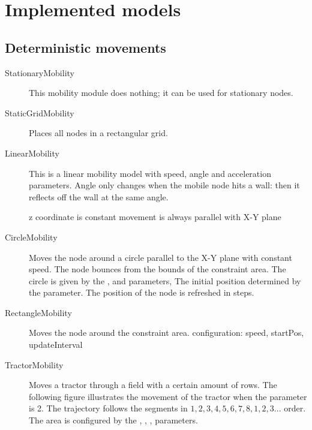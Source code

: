 \section{Implemented models}

\subsection{Deterministic movements}

\begin{description}

\item[StationaryMobility] This mobility module does nothing;
it can be used for stationary nodes.

\item[StaticGridMobility] Places all nodes in a rectangular grid.


\item[LinearMobility] This is a linear mobility model with speed,
angle and acceleration parameters. Angle only changes when the mobile
node hits a wall: then it reflects off the wall at the same angle.

z coordinate is constant
movement is always parallel with X-Y plane


\item[CircleMobility] Moves the node around a circle parallel to the X-Y plane
with constant speed.
The node bounces from the bounds of the constraint area.
The circle is given by the ,  and  parameters,
The initial position determined by the  parameter.
The position of the node is refreshed in  steps.

\item[RectangleMobility] Moves the node around the constraint area.
configuration: speed, startPos, updateInterval

\item[TractorMobility] Moves a tractor through a field with a certain
amount of rows. The following figure illustrates the movement of the
tractor when the  parameter is 2. The trajectory follows
the segments in $1,2,3,4,5,6,7,8,1,2,3...$ order. The area is configured
by the , , ,  parameters.


\end{description}
